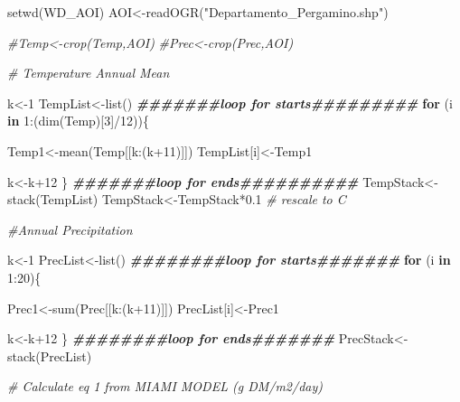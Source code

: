 \documentclass[
  10pt,
  b5paper,
]{book}
\newenvironment{Shaded}{\begin{snugshade}}{\end{snugshade}}
\newcommand{\CommentTok}[1]{\textcolor[rgb]{0.56,0.35,0.01}{\textit{#1}}}
\newcommand{\ControlFlowTok}[1]{\textcolor[rgb]{0.13,0.29,0.53}{\textbf{#1}}}
\newcommand{\DecValTok}[1]{\textcolor[rgb]{0.00,0.00,0.81}{#1}}
\newcommand{\DocumentationTok}[1]{\textcolor[rgb]{0.56,0.35,0.01}{\textbf{\textit{#1}}}}
\newcommand{\FloatTok}[1]{\textcolor[rgb]{0.00,0.00,0.81}{#1}}
\newcommand{\FunctionTok}[1]{\textcolor[rgb]{0.00,0.00,0.00}{#1}}
\newcommand{\NormalTok}[1]{#1}
\newcommand{\OtherTok}[1]{\textcolor[rgb]{0.56,0.35,0.01}{#1}}
\newcommand{\SpecialCharTok}[1]{\textcolor[rgb]{0.00,0.00,0.00}{#1}}
\newcommand{\StringTok}[1]{\textcolor[rgb]{0.31,0.60,0.02}{#1}}
\begin{document}
\begin{Shaded}
\begin{Highlighting}[]
\FunctionTok{setwd}\NormalTok{(WD\_AOI)}
\NormalTok{AOI}\OtherTok{\textless{}{-}}\FunctionTok{readOGR}\NormalTok{(}\StringTok{"Departamento\_Pergamino.shp"}\NormalTok{)}

\CommentTok{\#Temp\textless{}{-}crop(Temp,AOI)}
\CommentTok{\#Prec\textless{}{-}crop(Prec,AOI)}

\CommentTok{\# Temperature Annual Mean }

\NormalTok{k}\OtherTok{\textless{}{-}}\DecValTok{1}
\NormalTok{TempList}\OtherTok{\textless{}{-}}\FunctionTok{list}\NormalTok{()}
\DocumentationTok{\#\#\#\#\#\#\#loop for starts\#\#\#\#\#\#\#\#\#}
\ControlFlowTok{for}\NormalTok{ (i }\ControlFlowTok{in} \DecValTok{1}\SpecialCharTok{:}\NormalTok{(}\FunctionTok{dim}\NormalTok{(Temp)[}\DecValTok{3}\NormalTok{]}\SpecialCharTok{/}\DecValTok{12}\NormalTok{))\{}

\NormalTok{Temp1}\OtherTok{\textless{}{-}}\FunctionTok{mean}\NormalTok{(Temp[[k}\SpecialCharTok{:}\NormalTok{(k}\SpecialCharTok{+}\DecValTok{11}\NormalTok{)]])}
\NormalTok{TempList[i]}\OtherTok{\textless{}{-}}\NormalTok{Temp1}

\NormalTok{k}\OtherTok{\textless{}{-}}\NormalTok{k}\SpecialCharTok{+}\DecValTok{12}
\NormalTok{\}}
\DocumentationTok{\#\#\#\#\#\#\#loop for ends\#\#\#\#\#\#\#\#\#\#}
\NormalTok{TempStack}\OtherTok{\textless{}{-}}\FunctionTok{stack}\NormalTok{(TempList)}
\NormalTok{TempStack}\OtherTok{\textless{}{-}}\NormalTok{TempStack}\SpecialCharTok{*}\FloatTok{0.1} \CommentTok{\# rescale to C}

\CommentTok{\#Annual Precipitation}

\NormalTok{k}\OtherTok{\textless{}{-}}\DecValTok{1}
\NormalTok{PrecList}\OtherTok{\textless{}{-}}\FunctionTok{list}\NormalTok{()}
\DocumentationTok{\#\#\#\#\#\#\#\#loop for starts\#\#\#\#\#\#\#}
\ControlFlowTok{for}\NormalTok{ (i }\ControlFlowTok{in} \DecValTok{1}\SpecialCharTok{:}\DecValTok{20}\NormalTok{)\{}

\NormalTok{Prec1}\OtherTok{\textless{}{-}}\FunctionTok{sum}\NormalTok{(Prec[[k}\SpecialCharTok{:}\NormalTok{(k}\SpecialCharTok{+}\DecValTok{11}\NormalTok{)]])}
\NormalTok{PrecList[i]}\OtherTok{\textless{}{-}}\NormalTok{Prec1}

\NormalTok{k}\OtherTok{\textless{}{-}}\NormalTok{k}\SpecialCharTok{+}\DecValTok{12}
\NormalTok{\}}
\DocumentationTok{\#\#\#\#\#\#\#\#loop for ends\#\#\#\#\#\#\#}
\NormalTok{PrecStack}\OtherTok{\textless{}{-}}\FunctionTok{stack}\NormalTok{(PrecList)}

\CommentTok{\# Calculate eq 1 from MIAMI MODEL (g DM/m2/day)}


\end{Highlighting}
\end{Shaded}
\end{document}
